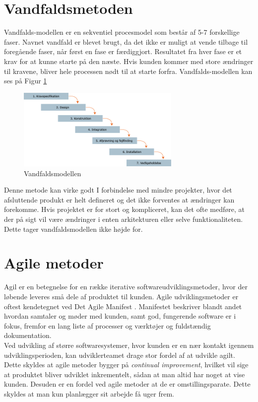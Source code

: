 \section{Vandfaldsmetoden}\label{sec:vandfald}
Vandfalds-modellen er en sekventiel procesmodel som består af 5-7 forskellige faser. 
Navnet vandfald er blevet brugt, da det ikke er muligt at vende tilbage til foregående faser, 
når først en fase er færdiggjort. Resultatet fra hver fase er et krav for at kunne starte på den næste. 
Hvis kunden kommer med store ændringer til kravene, bliver hele processen nødt til at starte forfra.  
Vandfalds-modellen kan ses på Figur \ref{fig:waterfallmodel} \\

\begin{figure}[h]
    \centering
    \includegraphics[width=0.7\textwidth]{figures/waterfall.png}
    \caption{Vandfaldsmodellen \cite{WaterfallModel}}
    \label{fig:waterfallmodel}
\end{figure}

Denne metode kan virke godt I forbindelse med mindre projekter, hvor det afsluttende produkt er 
helt defineret og det ikke forventes at ændringer kan forekomme. Hvis projektet er for stort og kompliceret,
kan det ofte medføre, at der på sigt vil være ændringer i enten arkitekturen eller selve funktionaliteten.
Dette tager vandfaldsmodellen ikke højde for.

\section{Agile metoder}\label{sec:agilemetoder}
Agil er en betegnelse for en række iterative softwareudviklingsmetoder, hvor der løbende leveres små dele af 
produktet til kunden. Agile udviklingsmetoder er oftest kendetegnet ved Det Agile Manifest \cite{AgileManifesto}.
Manifestet beskriver blandt andet hvordan samtaler og møder med kunden, samt god, fungerende software er i fokus, 
fremfor en lang liste af processer og værktøjer og fuldstændig dokumentation. \\

Ved udvikling af større softwaresystemer, hvor kunden er en nær kontakt igennem udviklingsperioden, kan udviklerteamet
drage stor fordel af at udvikle agilt. Dette skyldes at agile metoder bygger på \textit{continual improvement},
hvilket vil sige at produktet bliver udviklet inkrementelt, sådan at man altid har noget at vise kunden. Desuden er en fordel ved agile
metoder at de er omstillingsparate. Dette skyldes at man kun planlægger sit arbejde få uger frem.